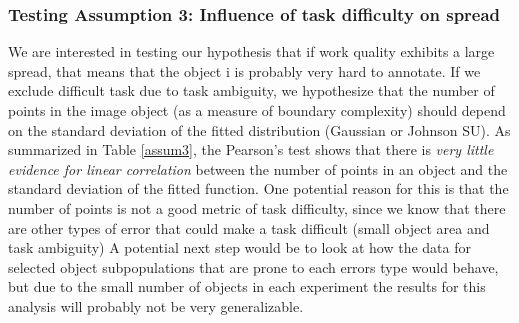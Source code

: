 \documentclass[12pt]{article}
\begin{document}
\subsubsection{Testing Assumption 3: Influence of task difficulty on spread}
We are interested in testing our hypothesis that if work quality exhibits a large spread, that means that the object i is probably very hard to annotate. If we exclude difficult task due to task ambiguity, we hypothesize that the number of points in the image object (as a measure of boundary complexity) should depend on the standard deviation of the fitted distribution (Gaussian or Johnson SU). As summarized in Table \ref{assum3}, the Pearson's test shows that there is \textit{very little evidence for linear correlation} between the number of points in an object and the standard deviation of the fitted function. One potential reason for this is that the number of points is not a good metric of task difficulty, since we know that there are other types of error that could make a task difficult (small object area and task ambiguity) A potential next step would be to look at how the data for selected object subpopulations that are prone to each errors type would behave, but due to the small number of objects in each experiment the results for this analysis will probably not be very generalizable. 


\end{document}
